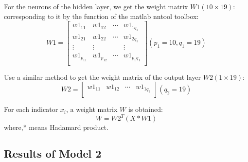 \documentclass[12pt]{mcmthesis}
\begin{document}
For the neurons of the hidden layer, we get the weight matrix $W1 (10\times19)$: corresponding to it by the function of the matlab nntool toolbox:
$$W1=\left[
    \begin{array}{cccc}
      w1_{11}& w1_{12} & \cdots & w1_{1q_1} \\
      w1_{21} & w1_{22} & \cdots & w1_{2q_1}\\
      \vdots & \vdots &  & \vdots\\
      w1_{p_11} & w1_{p_12} & \cdots & w1_{p_1q_1} \\
    \end{array}
  \right]
(p_1=10,q_1=19) $$\par
Use a similar method to get the weight matrix of the output layer $W2 (1\times19)$:
$$W2=\left[
    \begin{array}{cccc}
      w1_{11}& w1_{12} & \cdots & w1_{1q_2} \\
    \end{array}
  \right]
(q_2=19) $$\par
For each indicator $x_i$, a weight matrix $W$ is obtained:
\begin{equation}\label{juzheng}
W=W2^T(X*W1)
\end{equation}
where,* means Hadamard product.
\subsection{Results of Model 2}
\end{document}
